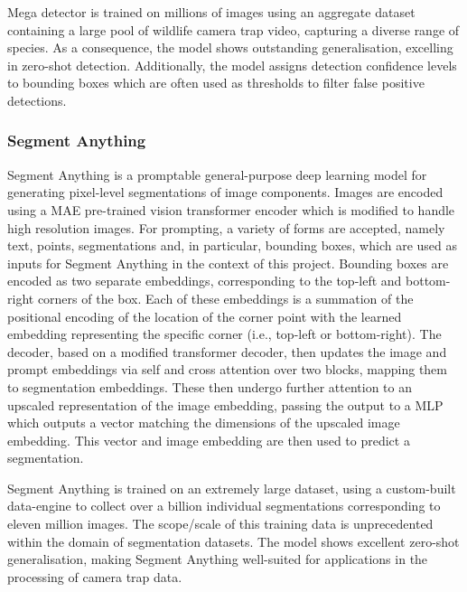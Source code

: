 Mega detector is trained on millions of images using an aggregate dataset containing
a large pool of wildlife camera trap video, capturing a diverse range of species.\cite{megadetector_article}
As a consequence, the model shows outstanding generalisation, excelling in zero-shot
detection.\cite{md_application1,md_application2}
Additionally, the model assigns detection confidence levels to bounding boxes which are often
used as thresholds to filter false positive detections.\cite{bird_classification}

\subsubsection{Segment Anything}

Segment Anything is a promptable general-purpose deep learning model for generating
pixel-level segmentations of image components.\cite{segment_anything}
Images are encoded using a MAE\cite{mae} pre-trained vision transformer encoder which is modified
to handle high resolution images.\cite{ViT_detection}
For prompting, a variety of forms are accepted,\cite{segment_anything} namely text, points,
segmentations and, in particular, bounding boxes, which are used as inputs for Segment Anything
in the context of this project.
Bounding boxes are encoded as two separate embeddings, corresponding to the top-left and bottom-right
corners of the box.
Each of these embeddings is a summation of the positional encoding\cite{positional_encoding} of the
location of the corner point with the learned embedding representing the specific corner
(i.e., top-left or bottom-right).\cite{segment_anything}
The decoder, based on a modified transformer decoder,\cite{transformer} then updates the image and prompt embeddings
via self and cross attention over two blocks, mapping them to segmentation embeddings.
These then undergo further attention to an upscaled representation of the image embedding,
passing the output to a MLP\cite{mlp} which outputs a vector matching the dimensions of the upscaled image embedding.
This vector and image embedding are then used to predict a segmentation.\cite{segment_anything}

Segment Anything is trained on an extremely large dataset, using a custom-built data-engine to collect
over a billion individual segmentations corresponding to eleven million images.
The scope/scale of this training data is unprecedented within the domain of segmentation datasets.
The model shows excellent zero-shot generalisation,\cite{segment_anything} making Segment Anything
well-suited for applications in the processing of camera trap data.





